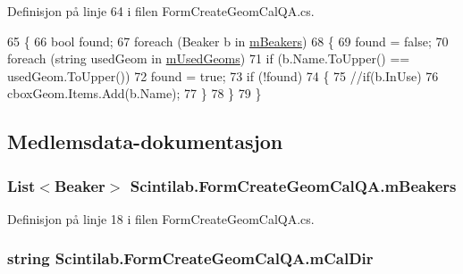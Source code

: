 Definisjon på linje 64 i filen Form\+Create\+Geom\+Cal\+Q\+A.\+cs.


\begin{DoxyCode}
65         \{
66             \textcolor{keywordtype}{bool} found;
67             \textcolor{keywordflow}{foreach} (Beaker b \textcolor{keywordflow}{in} \hyperlink{class_scintilab_1_1_form_create_geom_cal_q_a_a5ef5f866428bd7129184e31b6a38ce41}{mBeakers})
68             \{
69                 found = \textcolor{keyword}{false};
70                 \textcolor{keywordflow}{foreach} (\textcolor{keywordtype}{string} usedGeom \textcolor{keywordflow}{in} \hyperlink{class_scintilab_1_1_form_create_geom_cal_q_a_a090638f16b85aa89acccb3418e478297}{mUsedGeoms})
71                     \textcolor{keywordflow}{if} (b.Name.ToUpper() == usedGeom.ToUpper())
72                         found = \textcolor{keyword}{true};
73                 \textcolor{keywordflow}{if} (!found)
74                 \{
75                     \textcolor{comment}{//if(b.InUse)}
76                         cboxGeom.Items.Add(b.Name);
77                 \}
78             \}
79         \}
\end{DoxyCode}


\subsection{Medlemsdata-\/dokumentasjon}
\hypertarget{class_scintilab_1_1_form_create_geom_cal_q_a_a5ef5f866428bd7129184e31b6a38ce41}{
\subsubsection[{m\+Beakers}]{\setlength{\rightskip}{0pt plus 5cm}List$<${\bf Beaker}$>$ Scintilab.\+Form\+Create\+Geom\+Cal\+Q\+A.\+m\+Beakers\hspace{0.3cm}{\ttfamily [private]}}}\label{class_scintilab_1_1_form_create_geom_cal_q_a_a5ef5f866428bd7129184e31b6a38ce41}


Definisjon på linje 18 i filen Form\+Create\+Geom\+Cal\+Q\+A.\+cs.

\hypertarget{class_scintilab_1_1_form_create_geom_cal_q_a_a6364a9962eee023eba3af60d2b3f3a91}{
\subsubsection[{m\+Cal\+Dir}]{\setlength{\rightskip}{0pt plus 5cm}string Scintilab.\+Form\+Create\+Geom\+Cal\+Q\+A.\+m\+Cal\+Dir\hspace{0.3cm}{\ttfamily [private]}}}\label{class_scintilab_1_1_form_create_geom_cal_q_a_a6364a9962eee023eba3af60d2b3f3a91}


